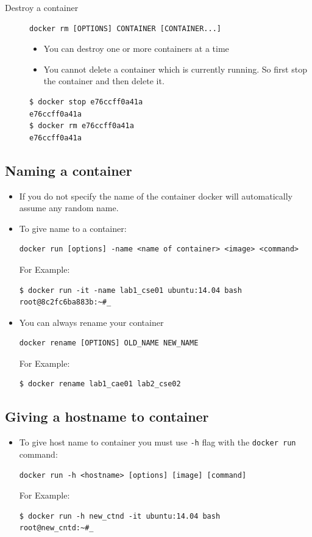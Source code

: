 \documentclass[11pt]{article}
\begin{document}
\begin{description}
\item[{Destroy a container}] \begin{verbatim}
docker rm [OPTIONS] CONTAINER [CONTAINER...]
\end{verbatim}
\begin{itemize}
\item You can destroy one or more containers at a time
\item You cannot delete a container which is currently running. So first stop the
container and then delete it.
\end{itemize}
\begin{verbatim}
$ docker stop e76ccff0a41a
e76ccff0a41a
$ docker rm e76ccff0a41a
e76ccff0a41a
\end{verbatim}
\end{description}

\subsection{Naming a container}
\label{sec:orgheadline10}
\begin{itemize}
\item If you do not specify the name of the container docker will automatically
assume any random name.
\item To give name to a container:
\begin{verbatim}
docker run [options] -name <name of container> <image> <command>
\end{verbatim}
For Example:
\begin{verbatim}
$ docker run -it -name lab1_cse01 ubuntu:14.04 bash
root@8c2fc6ba883b:~#_
\end{verbatim}
\item You can always rename your container
\begin{verbatim}
docker rename [OPTIONS] OLD_NAME NEW_NAME
\end{verbatim}
For Example:
\begin{verbatim}
$ docker rename lab1_cae01 lab2_cse02
\end{verbatim}
\end{itemize}

\subsection{Giving a hostname to container}
\label{sec:orgheadline11}
\begin{itemize}
\item To give host name to container you must use \texttt{-h} flag with the \texttt{docker run} command:
\begin{verbatim}
docker run -h <hostname> [options] [image] [command]
\end{verbatim}
For Example:
\begin{verbatim}
$ docker run -h new_ctnd -it ubuntu:14.04 bash
root@new_cntd:~#_
\end{verbatim}
\end{itemize}
\end{document}
